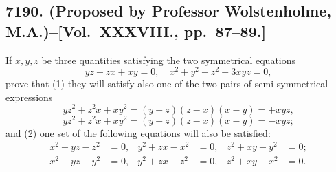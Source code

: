 \documentclass[11pt,a4paper]{article}
\theoremstyle{definition}
\begin{document}
\subsection*{7190. (Proposed by Professor Wolstenholme, M.A.)\---[Vol.~XXXVIII., pp.~87--89.]}

If $x,y,z$ be three quantities satisfying the two symmetrical equations
\[
yz+zx+xy=0, \quad x^2+y^2+z^2+3xyz=0,
\]
prove that (1) they will satisfy also one of the two pairs of semi-symmetrical expressions
\[
yz^2+z^2x+xy^2 = (y-z)(z-x)(x-y) = +xyz,
\]
\[
yz^2+z^2x+xy^2 = (y-z)(z-x)(x-y) = -xyz;
\]
and (2) one set of the following equations will also be satisfied:
\[
\begin{aligned}
x^2+yz-z^2&=0, & y^2+zx-x^2&=0, & z^2+xy-y^2&=0; \\
x^2+yz-y^2&=0, & y^2+zx-z^2&=0, & z^2+xy-x^2&=0.
\end{aligned}
\]
\end{document}
